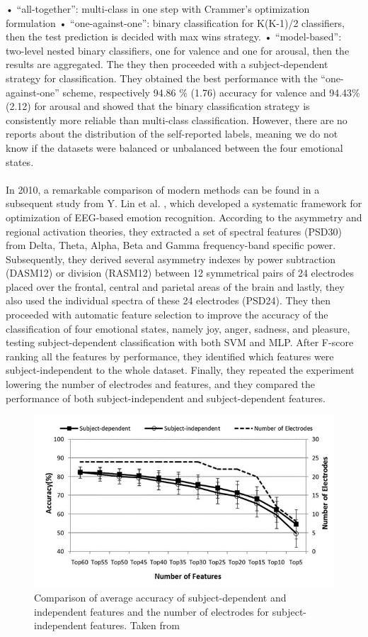 •	“all-together”: multi-class in one step with Crammer’s optimization formulation
•	“one-against-one”:  binary classification for K(K-1)/2 classifiers, then the test prediction is decided with max wins strategy.
•	“model-based”: two-level nested binary classifiers, one for valence and one for arousal, then the results are aggregated.
The they then proceeded with a subject-dependent strategy for classification. They obtained the best performance with the “one-against-one” scheme, respectively 94.86 \% (1.76) accuracy for valence and 94.43\% (2.12) for arousal and showed that the binary classification strategy is consistently more reliable than multi-class classification. However, there are no reports about the distribution of the self-reported labels, meaning we do not know if the datasets were balanced or unbalanced between the four emotional states.
\\
\\
In 2010, a remarkable comparison of modern methods can be found in a subsequent study from Y. Lin et al. \cite{lin_eeg-based_2010}, which developed a systematic framework for optimization of EEG-based emotion recognition. According to the asymmetry and regional activation theories, they extracted a set of spectral features (PSD30) from Delta, Theta, Alpha, Beta and Gamma frequency-band specific power. Subsequently, they derived several asymmetry indexes by power subtraction (DASM12) or division (RASM12) between 12 symmetrical pairs of 24 electrodes placed over the frontal, central and parietal areas of the brain and lastly, they also used the individual spectra of these 24 electrodes (PSD24). They then proceeded with automatic feature selection to improve the accuracy of the classification of four emotional states, namely joy, anger, sadness, and pleasure, testing subject-dependent classification with both \ac{SVM} and \ac{MLP}. After F-score ranking all the features by performance, they identified which features were subject-independent to the whole dataset. Finally, they repeated the experiment lowering the number of electrodes and features, and they compared the performance of both subject-independent and subject-dependent features.

\begin{figure}[h!]
\includegraphics[width=12cm]{img/related_work/lin_features_ranking.png}
\centering
\caption{Comparison of average accuracy of subject-dependent and independent features and the number of electrodes for subject-independent features. Taken from \cite{lin_eeg-based_2010}}\label{fig_lin_features_ranking}
\end{figure}

